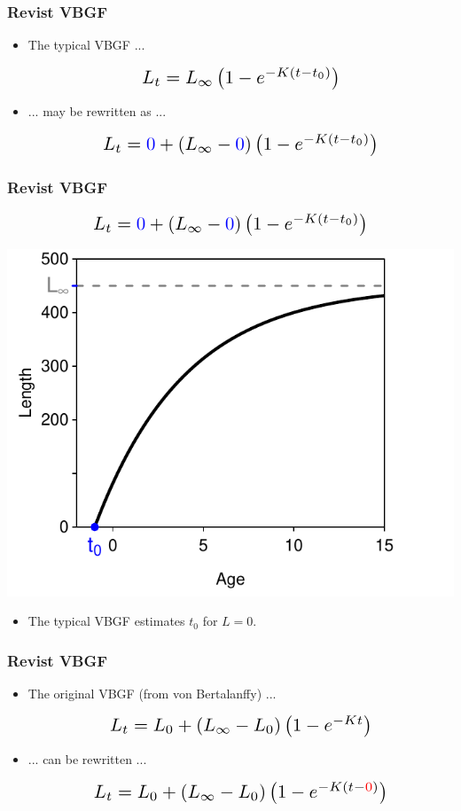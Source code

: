 \documentclass[xcolor=dvipsnames]{beamer}\usepackage[]{graphicx}\usepackage[]{color}
\makeatletter
\newenvironment{knitrout}{}{} %
\newcommand*{\Scale}[2][4]{\scalebox{#1}{\ensuremath{#2}}}%
\def\mathcolor#1#{\@mathcolor{#1}}
\def\@mathcolor#1#2#3{%
  \protect\leavevmode
  \begingroup
    \color#1{#2}#3%
  \endgroup
}
\makeatother
\begin{document}
\begin{frame}[fragile, t]
\frametitle{Revist VBGF}
\begin{itemize}
\item The typical VBGF ...

\[\Scale[1.5]{ L_{t} = L_{\infty}\left(1-e^{-K(t-t_{0})}\right) }\]

\bigskip
\item ... may be rewritten as ...

\[\Scale[1.5]{ L_{t} = \mathcolor{blue}{0} + (L_{\infty}-\mathcolor{blue}{0})\left(1-e^{-K(t-t_{0})}\right) }\]
\end{itemize}
\end{frame}


\begin{frame}
\frametitle{Revist VBGF}
\vspace{-14pt}
\[\Scale[1.5]{ L_{t} = \mathcolor{blue}{0} + (L_{\infty}-\mathcolor{blue}{0})\left(1-e^{-K(t-t_{0})}\right) }\]
\vspace{14pt}

\begin{knitrout}\footnotesize
{}\color{fgcolor}

{\centering \includegraphics[width=.5\linewidth]{Figs/redefineB-1} 

}



\end{knitrout}

\begin{itemize}
  \item The typical VBGF estimates $t_{0}$ for $L=0$.
\end{itemize}
\end{frame}


\begin{frame}[fragile, t]
\frametitle{Revist VBGF}
\begin{itemize}
\item The original VBGF (from von Bertalanffy) ...

\[\Scale[1.5]{ L_{t} = L_{0} + (L_{\infty}-L_{0})\left(1-e^{-Kt}\right) }\]

\bigskip
\item ... can be rewritten ...

\[\Scale[1.5]{ L_{t} = L_{0} + (L_{\infty}-L_{0})\left(1-e^{-K(t-\mathcolor{red}{0})}\right) }\]
\end{itemize}
\end{frame}
\end{document}
